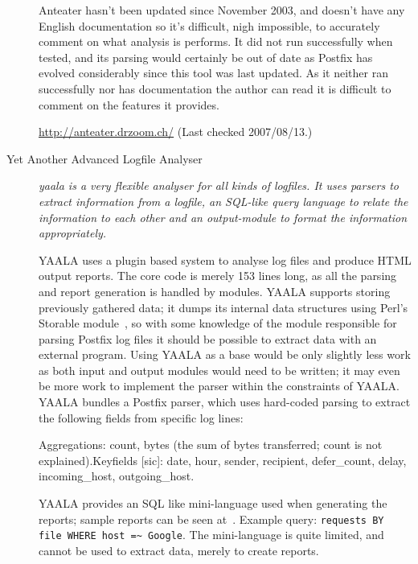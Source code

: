 \documentclass[a4paper,12pt,draft]{article}
\begin{document}
\begin{description}
        Anteater hasn't been updated since November 2003, and doesn't have
        any English documentation so it's difficult, nigh impossible, to
        accurately comment on what analysis is performs.  It did not run
        successfully when tested, and its parsing would certainly be out of
        date as Postfix has evolved considerably since this tool was last
        updated.  As it neither ran successfully nor has documentation the
        author can read it is difficult to comment on the features it
        provides.

        \url{http://anteater.drzoom.ch/} \newline (Last checked
        2007/08/13.)

    \item [Yet Another Advanced Logfile Analyser] \textit{yaala is a very
        flexible analyser for all kinds of logfiles. It uses parsers to
        extract information from a logfile, an SQL-like query language to
        relate the information to each other and an output-module to format
        the information appropriately.\/}

        YAALA uses a plugin based system to analyse log files and produce
        HTML output reports.  The core code is merely 153 lines long, as
        all the parsing and report generation is handled by modules.  YAALA
        supports storing previously gathered data; it dumps its internal
        data structures using Perl's Storable module~\cite{perl-storable},
        so with some knowledge of the module responsible for parsing
        Postfix log files it should be possible to extract data with an
        external program.  Using YAALA as a base would be only slightly
        less work as both input and output modules would need to be
        written; it may even be more work to implement the parser within
        the constraints of YAALA\@.  YAALA bundles a Postfix parser, which
        uses hard-coded parsing to extract the following fields from
        specific log lines:

        Aggregations: count, bytes (the sum of bytes transferred; count is
        not explained).\newline Keyfields [sic]: date, hour, sender,
        recipient, defer\_count, delay, incoming\_host, outgoing\_host.

        YAALA provides an SQL like mini-language used when generating the
        reports; sample reports can be seen at~\cite{yaala-samples}.
        Example query: \newline \hspace*{2em} \texttt{requests BY file
        WHERE host =\~{} Google}. \newline The mini-language is quite
        limited, and cannot be used to extract data, merely to create
        reports.


\end{description}
\end{document}
